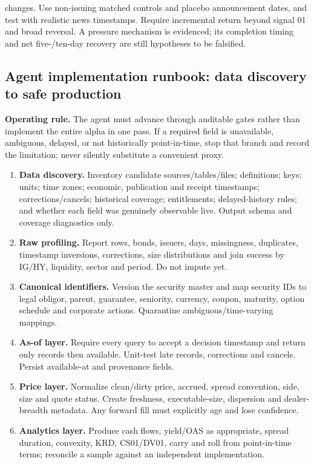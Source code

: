 \documentclass[10pt]{article}
\begin{document}
changes. Use non-issuing matched controls and placebo announcement dates, and test with realistic news timestamps. Require incremental return beyond signal 01 and broad reversal. A pressure mechanism is evidenced; its completion timing and net five-/ten-day recovery are still hypotheses to be falsified.
\subsection{Agent implementation runbook: data discovery to safe production}
\textbf{Operating rule.} The agent must advance through auditable gates rather than implement the entire alpha in one pass. If a required field is unavailable, ambiguous, delayed, or not historically point-in-time, stop that branch and record the limitation; never silently substitute a convenient proxy.
\begin{enumerate}[leftmargin=2em,label=\textbf{A\arabic*.}]
\item \textbf{Data discovery.} Inventory candidate sources/tables/files; definitions; keys; units; time zones; economic, publication and receipt timestamps; corrections/cancels; historical coverage; entitlements; delayed-history rules; and whether each field was genuinely observable live. Output schema and coverage diagnostics only.
\item \textbf{Raw profiling.} Report rows, bonds, issuers, days, missingness, duplicates, timestamp inversions, corrections, size distributions and join success by IG/HY, liquidity, sector and period. Do not impute yet.
\item \textbf{Canonical identifiers.} Version the security master and map security IDs to legal obligor, parent, guarantee, seniority, currency, coupon, maturity, option schedule and corporate actions. Quarantine ambiguous/time-varying mappings.
\item \textbf{As-of layer.} Require every query to accept a decision timestamp and return only records then available. Unit-test late records, corrections and cancels. Persist available-at and provenance fields.
\item \textbf{Price layer.} Normalize clean/dirty price, accrued, spread convention, side, size and quote status. Create freshness, executable-size, dispersion and dealer-breadth metadata. Any forward fill must explicitly age and lose confidence.
\item \textbf{Analytics layer.} Produce cash flows, yield/OAS as appropriate, spread duration, convexity, KRD, CS01/DV01, carry and roll from point-in-time terms; reconcile a sample against an independent implementation.

\end{enumerate}
\end{document}
